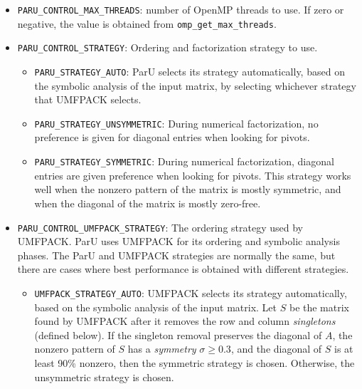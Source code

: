 \documentclass[12pt]{article}
\begin{document}
    \begin{itemize}
    \item \verb'PARU_CONTROL_MAX_THREADS': %
        number of OpenMP threads to use.  If zero or negative, the value is
        obtained from \verb'omp_get_max_threads'.

    \item \verb'PARU_CONTROL_STRATEGY': %
        Ordering and factorization strategy to use.

        \begin{itemize}
        \item \verb'PARU_STRATEGY_AUTO':  ParU selects its strategy
            automatically, based on the symbolic analysis of the input matrix,
            by selecting whichever strategy that UMFPACK selects.

        \item \verb'PARU_STRATEGY_UNSYMMETRIC':
            During numerical factorization, no preference is
            given for diagonal entries when looking for pivots.
        \item \verb'PARU_STRATEGY_SYMMETRIC':
            During numerical factorization, diagonal entries are given
            preference when looking for pivots.  This strategy works well when
            the nonzero pattern of the matrix is mostly symmetric, and when the
            diagonal of the matrix is mostly zero-free.

        \end{itemize}

    \item \verb'PARU_CONTROL_UMFPACK_STRATEGY': %
        The ordering strategy used by UMFPACK.  ParU uses UMFPACK for its
        ordering and symbolic analysis phases.  The ParU and UMFPACK strategies
        are normally the same, but there are cases where best performance is
        obtained with different strategies.

        \begin{itemize}
        \item \verb'UMFPACK_STRATEGY_AUTO':  UMFPACK selects its strategy
            automatically, based on the symbolic analysis of the input matrix.
            Let $S$ be the matrix found by UMFPACK after it removes the row and
            column {\em singletons} (defined below).  If the singleton removal
            preserves the diagonal of $A$, the nonzero pattern of $S$ has a
            {\em symmetry} $\sigma \ge 0.3$, and the diagonal of $S$ is at
            least 90\% nonzero, then the symmetric strategy is chosen.
            Otherwise, the unsymmetric strategy is chosen.


\end{itemize}
\end{itemize}
\end{document}
